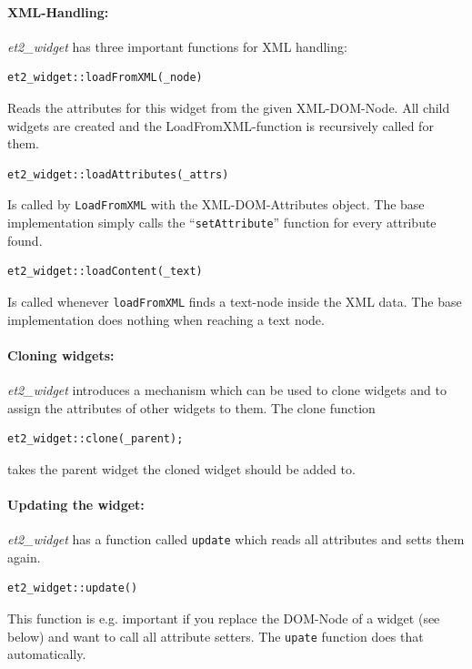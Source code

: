 \documentclass[10pt,a4paper]{report}
\begin{document}
\paragraph{XML-Handling:}
\textit{et2\_widget} has three important functions for XML handling:
\begin{verbatim}
et2_widget::loadFromXML(_node)
\end{verbatim}
Reads the attributes for this widget from the given XML-DOM-Node. All child widgets are created and the LoadFromXML-function is recursively called for them.

\begin{verbatim}
et2_widget::loadAttributes(_attrs)
\end{verbatim}
Is called by \texttt{LoadFromXML} with the XML-DOM-Attributes object. The base implementation simply calls the ``\texttt{setAttribute}'' function for every attribute found.

\begin{verbatim}
et2_widget::loadContent(_text)
\end{verbatim}
Is called whenever \texttt{loadFromXML} finds a text-node inside the XML data. The base implementation does nothing when reaching a text node.

\paragraph{Cloning widgets:}
\textit{et2\_widget} introduces a mechanism which can be used to clone widgets and to assign the attributes of other widgets to them. The clone function
\begin{verbatim}
et2_widget::clone(_parent);
\end{verbatim}
takes the parent widget the cloned widget should be added to.

\paragraph{Updating the widget:}
\textit{et2\_widget} has a function called \texttt{update} which reads all attributes and setts them again.
\begin{verbatim}
et2_widget::update()
\end{verbatim}
This function is e.g. important if you replace the DOM-Node of a widget (see below) and want to call all attribute setters. The \texttt{upate} function does that automatically.
\end{document}

